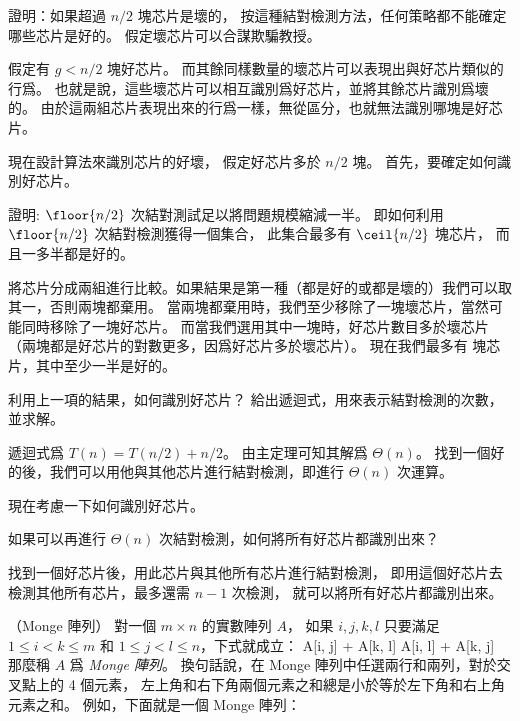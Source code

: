 \startigBase[a]
\item 證明：如果超過 $n/2$ 塊芯片是壞的，
按這種結對檢測方法，任何策略都不能確定哪些芯片是好的。
假定壞芯片可以合謀欺騙教授。

\startANSWER
假定有 $g < n/2$ 塊好芯片。
而其餘同樣數量的壞芯片可以表現出與好芯片類似的行爲。
也就是說，這些壞芯片可以相互識別爲好芯片，並將其餘芯片識別爲壞的。
由於這兩組芯片表現出來的行爲一樣，無從區分，也就無法識別哪塊是好芯片。
\stopANSWER

現在設計算法來識別芯片的好壞，
假定好芯片多於 $n/2$ 塊。
首先，要確定如何識別好芯片。

\item 證明:
$\floor{n/2}$ 次結對測試足以將問題規模縮減一半。
即如何利用 $\floor{n/2}$ 次結對檢測獲得一個集合，
此集合最多有 $\ceil{n/2}$ 塊芯片，
而且一多半都是好的。

\startANSWER
將芯片分成兩組進行比較。如果結果是第一種（都是好的或都是壞的）我們可以取其一，否則兩塊都棄用。
當兩塊都棄用時，我們至少移除了一塊壞芯片，當然可能同時移除了一塊好芯片。
而當我們選用其中一塊時，好芯片數目多於壞芯片（兩塊都是好芯片的對數更多，因爲好芯片多於壞芯片）。
現在我們最多有  塊芯片，其中至少一半是好的。
\stopANSWER

\item 利用上一項的結果，如何識別好芯片？
給出遞迴式，用來表示結對檢測的次數，並求解。

\startANSWER
遞迴式爲 $T(n) = T(n/2) + n/2$。
由主定理可知其解爲 $\Theta(n)$。
找到一個好的後，我們可以用他與其他芯片進行結對檢測，即進行 $\Theta(n)$ 次運算。
\stopANSWER

現在考慮一下如何識別好芯片。

\startitem
如果可以再進行 $\Theta(n)$ 次結對檢測，如何將所有好芯片都識別出來？
\stopitem

\startANSWER
找到一個好芯片後，用此芯片與其他所有芯片進行結對檢測，
即用這個好芯片去檢測其他所有芯片，最多還需 $n-1$ 次檢測，
就可以將所有好芯片都識別出來。
\stopANSWER

\stopigBase
\stopPROBLEM

\startPROBLEM（Monge 陣列）
對一個 $m\times n$ 的實數陣列 $A$，
如果 $i,j,k,l$ 只要滿足 $1\le i < k \le m$ 和 $1\le j < l \le n$，下式就成立：
\startformula
A[i, j] + A[k, l] \le A[i, l] + A[k, j]
\stopformula
那麼稱 $A$ 爲 \emph{Monge 陣列}。
換句話說，在 Monge 陣列中任選兩行和兩列，對於交叉點上的 4 個元素，
左上角和右下角兩個元素之和總是小於等於左下角和右上角元素之和。
例如，下面就是一個 Monge 陣列：
\startformula\startmatrix
{}     \NR
{}     \NR
{}     \NR
{}     \NR
{}     \NR
{}     \NR
{}     \NR
\stopmatrix\stopformula

